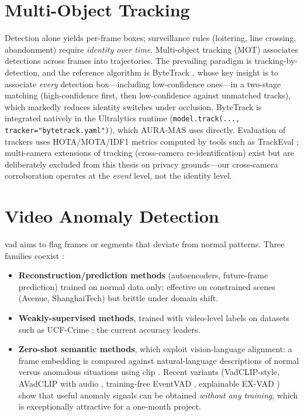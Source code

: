 \section{Multi-Object Tracking}

Detection alone yields per-frame boxes; surveillance rules (loitering, line crossing, abandonment) require \emph{identity over time}. Multi-object tracking (MOT) associates detections across frames into trajectories. The prevailing paradigm is tracking-by-detection, and the reference algorithm is ByteTrack \cite{zhang2022bytetrack}, whose key insight is to associate \emph{every} detection box---including low-confidence ones---in a two-stage matching (high-confidence first, then low-confidence against unmatched tracks), which markedly reduces identity switches under occlusion. ByteTrack is integrated natively in the Ultralytics runtime (\texttt{model.track(..., tracker="bytetrack.yaml")}), which AURA-MAS uses directly. Evaluation of trackers uses HOTA/MOTA/IDF1 metrics computed by tools such as TrackEval \cite{luiten2020trackeval, mendez2024metrics}; multi-camera extensions of tracking (cross-camera re-identification) exist \cite{amosa2023multicamera, fei2023momct} but are deliberately excluded from this thesis on privacy grounds---our cross-camera corroboration operates at the \emph{event} level, not the identity level.

\section{Video Anomaly Detection}

\gls{vad} aims to flag frames or segments that deviate from normal patterns. Three families coexist \cite{gong2025survey}:

\begin{itemize}
    \item \textbf{Reconstruction/prediction methods} (autoencoders, future-frame prediction) trained on normal data only; effective on constrained scenes (Avenue, ShanghaiTech) but brittle under domain shift.
    \item \textbf{Weakly-supervised methods}, trained with video-level labels on datasets such as UCF-Crime \cite{sultani2018ucfcrime}; the current accuracy leaders.
    \item \textbf{Zero-shot semantic methods}, which exploit vision-language alignment: a frame embedding is compared against natural-language descriptions of normal versus anomalous situations using \gls{clip} \cite{radford2021clip}. Recent variants (VadCLIP-style, AVadCLIP with audio \cite{wu2025avadclip}, training-free EventVAD \cite{shao2025eventvad}, explainable EX-VAD \cite{huang2025exvad}) show that useful anomaly signals can be obtained \emph{without any training}, which is exceptionally attractive for a one-month project.
\end{itemize}

